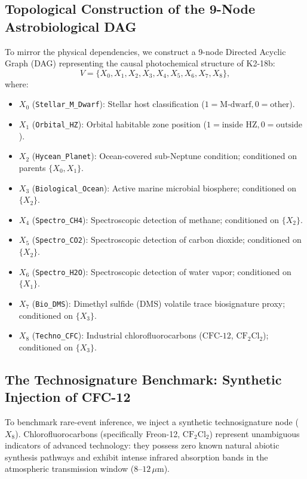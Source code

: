 \subsection{Topological Construction of the 9-Node Astrobiological DAG}
To mirror the physical dependencies, we construct a 9-node Directed Acyclic Graph (DAG) representing the causal photochemical structure of K2-18b:
\begin{equation}
V = \{X_0, X_1, X_2, X_3, X_4, X_5, X_6, X_7, X_8\},
\end{equation}
where:
\begin{itemize}
    \item $X_0$ (\texttt{Stellar\_M\_Dwarf}): Stellar host classification ($1 = \text{M-dwarf}, 0 = \text{other}$).
    \item $X_1$ (\texttt{Orbital\_HZ}): Orbital habitable zone position ($1 = \text{inside HZ}, 0 = \text{outside}$).
    \item $X_2$ (\texttt{Hycean\_Planet}): Ocean-covered sub-Neptune condition; conditioned on parents $\{X_0, X_1\}$.
    \item $X_3$ (\texttt{Biological\_Ocean}): Active marine microbial biosphere; conditioned on $\{X_2\}$.
    \item $X_4$ (\texttt{Spectro\_CH4}): Spectroscopic detection of methane; conditioned on $\{X_2\}$.
    \item $X_5$ (\texttt{Spectro\_CO2}): Spectroscopic detection of carbon dioxide; conditioned on $\{X_2\}$.
    \item $X_6$ (\texttt{Spectro\_H2O}): Spectroscopic detection of water vapor; conditioned on $\{X_1\}$.
    \item $X_7$ (\texttt{Bio\_DMS}): Dimethyl sulfide ($\mathrm{DMS}$) volatile trace biosignature proxy; conditioned on $\{X_3\}$.
    \item $X_8$ (\texttt{Techno\_CFC}): Industrial chlorofluorocarbons ($\mathrm{CFC\text{-}12}$, $\mathrm{CF}_2\mathrm{Cl}_2$); conditioned on $\{X_3\}$.
\end{itemize}

\subsection{The Technosignature Benchmark: Synthetic Injection of CFC-12}
To benchmark rare-event inference, we inject a synthetic technosignature node ($X_8$). Chlorofluorocarbons (specifically Freon-12, $\mathrm{CF}_2\mathrm{Cl}_2$) represent unambiguous indicators of advanced technology: they possess zero known natural abiotic synthesis pathways and exhibit intense infrared absorption bands in the atmospheric transmission window ($8$--$12\,\mu\text{m}$). 

